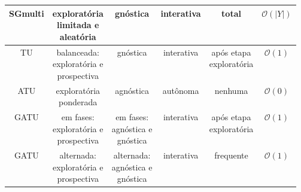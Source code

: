 \begin{table}
{\begin{tabular}{c|c|c|c|c|c}
SGmulti&\makecell{exploratória\\limitada e\\aleatória}&gnóstica&interativa&total&$\mathcal{O}(|Y|)$\\ \hline
TU&\makecell{balanceada:\\exploratória e\\prospectiva}&gnóstica&interativa&\makecell{após etapa\\exploratória}&$\mathcal{O}(1)$\\ \hline
ATU&\makecell{exploratória\\ponderada}&agnóstica&autônoma&nenhuma&$\mathcal{O}(0)$\\ \hline
GATU&\makecell{em fases:\\exploratória e\\prospectiva}&\makecell{em fases:\\agnóstica e\\gnóstica}&interativa&\makecell{após etapa\\exploratória}&$\mathcal{O}(1)$\\ \hline
GATU&\makecell{alternada:\\exploratória e\\prospectiva}&\makecell{alternada:\\agnóstica e\\gnóstica}&interativa&frequente&$\mathcal{O}(1)$\\ \hline
\end{tabular}
}
\label{stratscompleta}
\end{table}
